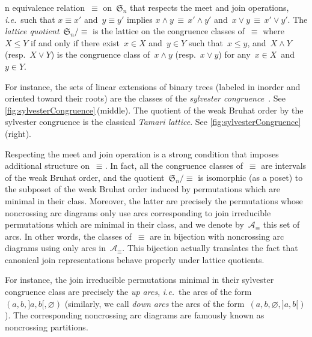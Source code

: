 \documentclass{amsart}
\theoremstyle{definition}
\renewcommand{\c}[1]{\mathcal{#1}} %
\newcommand{\f}[1]{\mathfrak{#1}} %
\newcommand{\ie}{\textit{i.e.}~} %
\newcommand{\darkblue}{\color{darkblue}} %
\newcommand{\defn}[1]{\textsl{\darkblue #1}} %
\newcommand{\meet}{\wedge} %
\newcommand{\join}{\vee} %
\begin{document}
n equivalence relation~$\equiv$ on~$\f{S}_n$ that respects the meet and join operations, \ie such that $x \equiv x'$ and~$y \equiv y'$ implies $x \meet y \, \equiv \, x' \meet y'$ and~$x \join y \, \equiv \, x' \join y'$.
The \defn{lattice quotient}~$\f{S}_n/{\equiv}$ is the lattice on the congruence classes of~$\equiv$ where~$X \le Y$ if and only if there exist~$x \in X$ and~$y \in Y$ such that~$x \le y$, and~$X \meet Y$ (resp.~$X \join Y$) is the congruence class of~$x \meet y$ (resp.~$x \join y$) for any~$x \in X$~and~$y \in Y$.

For instance, the sets of linear extensions of binary trees (labeled in inorder and oriented toward their roots) are the classes of the \defn{sylvester congruence}~\cite{MR2142078}.
See \cref{fig:sylvesterCongruence}\,(middle).
The quotient of the weak Bruhat order by the sylvester congruence is the classical \defn{Tamari lattice}.
See \cref{fig:sylvesterCongruence}\,(right).

Respecting the meet and join operation is a strong condition that imposes additional structure on~$\equiv$.
In fact, all the congruence classes of~$\equiv$ are intervals of the weak Bruhat order, and the quotient~$\f{S}_n/{\equiv}$ is isomorphic (as a poset) to the subposet of the weak Bruhat order induced by permutations which are minimal in their class.
Moreover, the latter are precisely the permutations whose noncrossing arc diagrams only use arcs corresponding to join irreducible permutations which are minimal in their class, and we denote by~$\c{A}_\equiv$ this set of arcs.
In other words, the classes of~$\equiv$ are in bijection with noncrossing arc diagrams using only arcs in~$\c{A}_\equiv$.
This bijection actually translates the fact that canonical join representations behave properly under lattice quotients.

For instance, the join irreducible permutations minimal in their sylvester congruence class are precisely the \defn{up arcs}, \ie the arcs of the form~$(a, b, {]a,b[}, \varnothing)$ (similarly, we call \defn{down arcs} the arcs of the form~$(a, b, \varnothing, {]a,b[})$
).
The corresponding noncrossing arc diagrams are famously known as noncrossing partitions.
\end{document}
